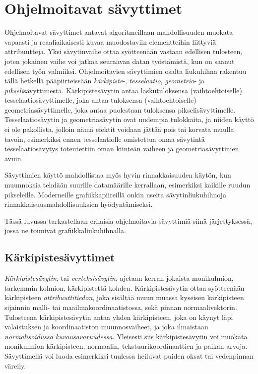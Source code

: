 \documentclass[finnish]{tktltiki2}
\theoremstyle{definition}
\theoremstyle{remark}
\begin{document}
\section{Ohjelmoitavat sävyttimet}

Ohjelmoitavat sävyttimet antavat algoritmeillaan mahdollisuuden muokata vapaasti ja reaaliaikaisesti kuvaa muodostaviin elementteihin liittyviä attribuutteja. Yksi sävytinvaihe ottaa syötteenään vastaan edellisen tulosteen, joten jokainen vaihe voi jatkaa seuraavan datan työstämistä, kun on saanut edellisen työn valmiiksi. Ohjelmoitavien sävyttimien osalta liukuhihna rakentuu tällä hetkellä pääpiirteissään \emph{kärkipiste}-, \emph{tesselaatio}, \emph{geometria}- ja \emph{pikseli}sävyttimestä. Kärkipistesävytin antaa laskutuloksensa (vaihtoehtoiselle) tesselaatiosävyttimelle, joka antaa tuloksensa (vaihtoehtoiselle) geometriasävyttimelle, joka antaa puolestaan tuloksensa pikselisävyttimelle. Tesselaatiosävytin ja geometriasävytin ovat uudempia tulokkaita, ja niiden käyttö ei ole pakollista, jolloin nämä efektit voidaan jättää pois tai korvata muulla tavoin, esimerkiksi ennen tesselaatiolle omistettua omaa sävytintä tesselaatiosävytys toteutettiin oman kiinteän vaiheen ja geometriasävyttimen avuin.

Sävyttimien käyttö mahdollistaa myös hyvin rinnakkaisuuden käytön, kun muunnoksia tehdään suurille datamäärille kerrallaan, esimerkiksi kaikille ruudun pikseleille. Moderneille grafiikkapiireillä onkin useita sävytinliukuhihnoja rinnakkaisuusmahdollisuuksien hyödyntämiseksi.

Tässä luvussa tarkastellaan erilaisia ohjelmoitavia sävyttimiä siinä järjestyksessä, jossa ne toimivat grafiikkaliukuhihnalla.

\subsection{Kärkipistesävyttimet}

\emph{Kärkipistesävytin}, tai \emph{verteksisävytin}, ajetaan kerran jokaista monikulmion, tarkemmin kolmion, kärkipistettä kohden. Kärkipistesävytin ottaa syötteenään kärkipisteen \emph{attribuuttitiedon}, joka sisältää muun muassa kyseisen kärkipisteen sijainnin malli- tai maailmakoordinaatistossa, sekä pinnan normaalivektorin. Tulosteena kärkipistesävytin antaa yhden kärkipisteen, joka on käynyt läpi valaistuksen ja koordinaatiston muunnosvaiheet, ja joka ilmaistaan \emph{normalisoidussa kuvausavaruudessa}. Yleisesti siis kärkipistesävytin voi muokata monikulmion kärkipisteen, normaalin, tekstuurikoordinaattien ja paikan arvoja. Sävyttimellä voi luoda esimerkiksi tuulessa heiluvat puiden oksat tai vedenpinnan väreily.
\end{document}
